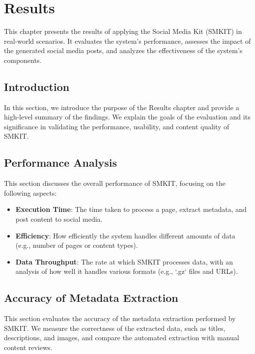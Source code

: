 
\chapter{Results}
\label{chp:results}

This chapter presents the results of applying the Social Media Kit (SMKIT) in real-world scenarios. It evaluates the system's performance, assesses the impact of the generated social media posts, and analyzes the effectiveness of the system's components.

\section{Introduction}
\label{sec:results_introduction}
In this section, we introduce the purpose of the Results chapter and provide a high-level summary of the findings. We explain the goals of the evaluation and its significance in validating the performance, usability, and content quality of SMKIT.


\section{Performance Analysis}
\label{sec:performance_analysis}
This section discusses the overall performance of SMKIT, focusing on the following aspects:

\begin{itemize}
    \item \textbf{Execution Time}: The time taken to process a page, extract metadata, and post content to social media.
    \item \textbf{Efficiency}: How efficiently the system handles different amounts of data (e.g., number of pages or content types).
    \item \textbf{Data Throughput}: The rate at which SMKIT processes data, with an analysis of how well it handles various formats (e.g., `.gz` files and URLs).
\end{itemize}


\section{Accuracy of Metadata Extraction}
\label{sec:metadata_extraction_accuracy}
This section evaluates the accuracy of the metadata extraction performed by SMKIT. We measure the correctness of the extracted data, such as titles, descriptions, and images, and compare the automated extraction with manual content reviews.

